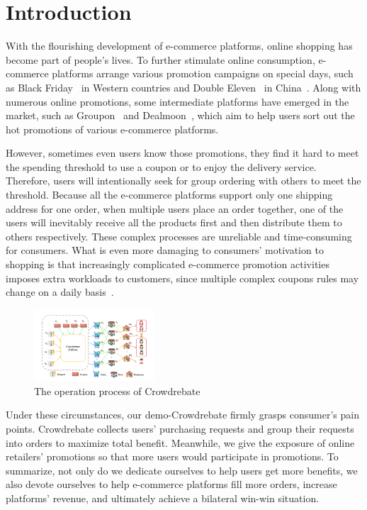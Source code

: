 \section{Introduction}

With the flourishing development of e-commerce platforms, online shopping has become part of people's lives. To further stimulate online consumption, e-commerce platforms arrange various promotion campaigns on special days, such as Black Friday~\cite{2013Black} in Western countries and Double Eleven~\cite{double11} in China~\cite{huang2019x}. Along with numerous online promotions, some intermediate platforms have emerged in the market, such as Groupon~\cite{groupon} and Dealmoon~\cite{dealmoon}, which aim to help users sort out the hot promotions of various e-commerce platforms.

However, sometimes even users know those promotions, they find it hard to meet the spending threshold to use a coupon or to enjoy the delivery service. Therefore, users will intentionally seek for group ordering with others to meet the threshold. Because all the e-commerce platforms support only one shipping address for one order, when multiple users place an order together, one of the users will inevitably receive all the products first and then distribute them to others respectively. These complex processes are unreliable and time-consuming for consumers. What is even more damaging to consumers' motivation to shopping is that increasingly complicated e-commerce promotion activities imposes extra workloads to customers, since multiple complex coupons rules may change on a daily basis~\cite{double2020}.
\begin{figure}[t] 
\centering %
		\includegraphics[width=0.4\textwidth]{../figure/crowdrebate process.png} %
	\caption{The operation process of Crowdrebate} %
	\label{fig:Crowdrebate} %
	\end{figure}

Under these circumstances, our demo-Crowdrebate firmly grasps consumer's pain points. Crowdrebate collects users’
purchasing requests and group their requests into orders to
maximize total benefit. Meanwhile, we give the exposure of online retailers' promotions so that more users would participate in promotions. To summarize, not only do we dedicate ourselves to help users get more benefits, we also devote ourselves to help e-commerce platforms fill more orders, increase platforms’ revenue, and ultimately achieve a bilateral win-win situation.

